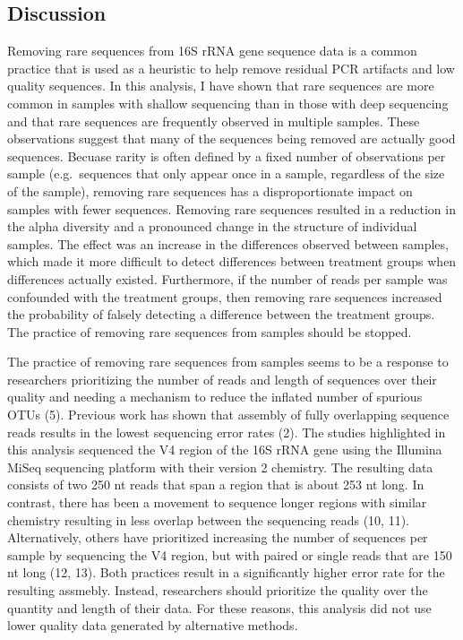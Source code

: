 \documentclass[
]{article}
\begin{document}
\hypertarget{discussion}{%
\subsection{Discussion}\label{discussion}}

Removing rare sequences from 16S rRNA gene sequence data is a common
practice that is used as a heuristic to help remove residual PCR
artifacts and low quality sequences. In this analysis, I have shown that
rare sequences are more common in samples with shallow sequencing than
in those with deep sequencing and that rare sequences are frequently
observed in multiple samples. These observations suggest that many of
the sequences being removed are actually good sequences. Becuase rarity
is often defined by a fixed number of observations per sample
(e.g.~sequences that only appear once in a sample, regardless of the
size of the sample), removing rare sequences has a disproportionate
impact on samples with fewer sequences. Removing rare sequences resulted
in a reduction in the alpha diversity and a pronounced change in the
structure of individual samples. The effect was an increase in the
differences observed between samples, which made it more difficult to
detect differences between treatment groups when differences actually
existed. Furthermore, if the number of reads per sample was confounded
with the treatment groups, then removing rare sequences increased the
probability of falsely detecting a difference between the treatment
groups. The practice of removing rare sequences from samples should be
stopped.

The practice of removing rare sequences from samples seems to be a
response to researchers prioritizing the number of reads and length of
sequences over their quality and needing a mechanism to reduce the
inflated number of spurious OTUs (5). Previous work has shown that
assembly of fully overlapping sequence reads results in the lowest
sequencing error rates (2). The studies highlighted in this analysis
sequenced the V4 region of the 16S rRNA gene using the Illumina MiSeq
sequencing platform with their version 2 chemistry. The resulting data
consists of two 250 nt reads that span a region that is about 253 nt
long. In contrast, there has been a movement to sequence longer regions
with similar chemistry resulting in less overlap between the sequencing
reads (10, 11). Alternatively, others have prioritized increasing the
number of sequences per sample by sequencing the V4 region, but with
paired or single reads that are 150 nt long (12, 13). Both practices
result in a significantly higher error rate for the resulting assmebly.
Instead, researchers should prioritize the quality over the quantity and
length of their data. For these reasons, this analysis did not use lower
quality data generated by alternative methods.
\end{document}
